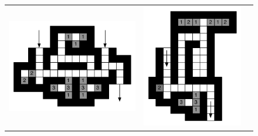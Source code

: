\documentclass[12pt]{article}
\begin{document}
\begin{figure}[h]
\begin{center}
  \begin{tabular}{c c c}
    \includegraphics[scale=0.58]{./figures/porteAND} &
    \includegraphics[scale=0.58]{./figures/porteSWITCH} &

\end{tabular}
\end{center}
\end{figure}
\end{document}
